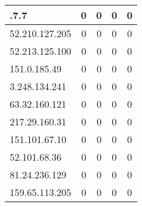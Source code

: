 \documentclass{article}
\begin{document}
\begin{longtable}{|>{\raggedright\arraybackslash}p{3cm}|c|c|c|c|}
    63.32.7.7 & 0 & 0 & 0 & 0 \\
    \hline
    
    
    \rowcolor{lightgreen} %
    
    52.210.127.205 & 0 & 0 & 0 & 0 \\
    \hline
    
    
    \rowcolor{lightgreen} %
    
    52.213.125.100 & 0 & 0 & 0 & 0 \\
    \hline
    
    
    \rowcolor{lightgreen} %
    
    151.0.185.49 & 0 & 0 & 0 & 0 \\
    \hline
    
    
    \rowcolor{lightgreen} %
    
    3.248.134.241 & 0 & 0 & 0 & 0 \\
    \hline
    
    
    \rowcolor{lightgreen} %
    
    63.32.160.121 & 0 & 0 & 0 & 0 \\
    \hline
    
    
    \rowcolor{lightgreen} %
    
    217.29.160.31 & 0 & 0 & 0 & 0 \\
    \hline
    
    
    \rowcolor{lightgreen} %
    
    151.101.67.10 & 0 & 0 & 0 & 0 \\
    \hline
    
    
    \rowcolor{lightgreen} %
    
    52.101.68.36 & 0 & 0 & 0 & 0 \\
    \hline
    
    
    \rowcolor{lightgreen} %
    
    81.24.236.129 & 0 & 0 & 0 & 0 \\
    \hline
    
    
    \rowcolor{lightgreen} %
    
    159.65.113.205 & 0 & 0 & 0 & 0 \\
    \hline
    

\end{longtable}
\end{document}
